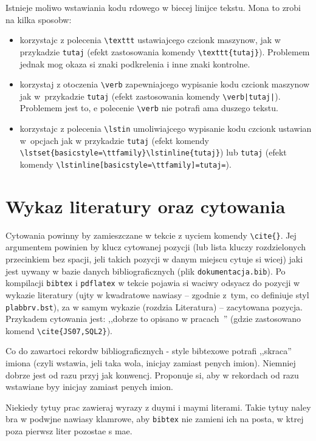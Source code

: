 Istnieje moliwo wstawiania kodu rdowego w biecej linijce tekstu. Mona to zrobi na kilka sposobw:
\begin{itemize} 
\item korzystajc z polecenia \verb?\texttt? ustawiajcego czcionk maszynow, jak w przykadzie \texttt{tutaj} (efekt zastosowania komendy \verb?\texttt{tutaj}?). Problemem jednak mog okaza si znaki podkrelenia i inne znaki kontrolne.
\item korzystaj z otoczenia \verb?\verb? zapewniajcego wypisanie kodu czcionk maszynow jak w~przykadzie \verb|tutaj| (efekt zastosowania komendy \verb?\verb|tutaj|?). Problemem jest to, e polecenie \verb?\verb? nie potrafi ama duszego tekstu.
\item korzystajc z polecenia \verb?\lstin? umoliwiajcego wypisanie kodu czcionk ustawian w~opcjach jak w przykadzie
\lstset{basicstyle=\ttfamily}\lstinline{tutaj} (efekt komendy \verb+\lstset{basicstyle=\ttfamily}\lstinline{tutaj}+) lub \lstinline[basicstyle=\ttfamily]=tutaj= (efekt komendy \verb+\lstinline[basicstyle=\ttfamily]=tutaj=+).
\end{itemize}

\section{Wykaz literatury oraz cytowania}
\label{sec:literatura}
Cytowania powinny by zamieszczane w tekcie z uyciem komendy \verb+\cite{}+. Jej argumentem powinien by klucz cytowanej pozycji (lub lista kluczy  rozdzielonych przecinkiem bez spacji, jeli takich pozycji w danym miejscu cytuje si wicej) jaki jest uywany w bazie danych bibliograficznych (plik \texttt{dokumentacja.bib}). Po kompilacji \texttt{bibtex} i \texttt{pdflatex} w tekcie pojawia si waciwy odsyacz do pozycji w wykazie literatury (ujty w kwadratowe nawiasy -- zgodnie z~tym, co definiuje styl \texttt{plabbrv.bst}), za w samym wykazie (rozdzia Literatura) -- zacytowana pozycja. Przykadem cytowania jest: ,,dobrze to opisano w pracach~\cite{JS07,SQL2}'' (gdzie zastosowano komend \verb?\cite{JS07,SQL2}?).

Co do zawartoci rekordw bibliograficznych - style bibtexowe potrafi ,,skraca'' imiona (czyli wstawia, jeli taka wola, inicjay zamiast penych imion). Niemniej dobrze jest od razu przyj jak konwencj. Proponuje si, aby w rekordach od razu wstawiane byy inicjay zamiast penych imion.

Niekiedy tytuy prac zawieraj wyrazy z duymi i maymi literami. Takie tytuy naley bra w podwjne nawiasy klamrowe, aby \texttt{bibtex} nie zamieni ich na posta, w ktrej poza pierwsz liter pozostae s mae.

